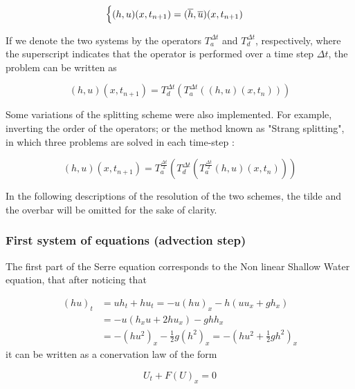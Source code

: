 \begin{equation}
\begin{cases}
(h,u)(x,t_{n+1}) = (\overline{h},\overline{u})(x,t_{n+1})
\end{cases}
\end{equation}

\indent If we denote the two systems by the operators $T_a^{\Delta t}$ and $T_d^{\Delta t}$, respectively, where the superscript indicates that the operator is performed over a time step $\Delta t$, the problem can be written as

\begin{equation}
(h,u)(x,t_{n+1}) = T_d^{\Delta t} \left( T_a^{\Delta t} \left((h,u)(x,t_n) \right) \right)
\end{equation}

\indent Some variations of the splitting scheme were also implemented. For example, inverting the order of the operators; or the method known as "Strang splitting", in which three problems are solved in each time-step :

\begin{equation}
(h,u)(x,t_{n+1}) = T_a^{\frac{\Delta t}{2}} \left( T_d^{\Delta t} \left( T_a^{\frac{\Delta t}{2}} (h,u)(x,t_n) \right) \right)
\end{equation}

\noindent In the following descriptions of the resolution of the two schemes, the tilde and the overbar will be omitted for the sake of clarity.

\subsubsection{First system of equations (advection step)}

\noindent The first part of the Serre equation corresponds to the Non linear Shallow Water equation, that after noticing that 

\begin{align*}
(hu)_t &= uh_t + hu_t = -u(hu)_x - h\left(uu_x + gh_x\right) \\
	&= -u\left (h_xu + 2hu_x \right) - ghh_x  \\
	&= -\left(hu^2\right)_x - \frac{1}{2}g\left(h^2\right)_x = - \left(hu^2 +  \frac{1}{2}gh^2 \right)_x
\end{align*}
\noindent it can be written as a conervation law of the form

\begin{equation}
	U_t + F(U)_x = 0
	\label{serre:conservative_swe}
\end{equation}

